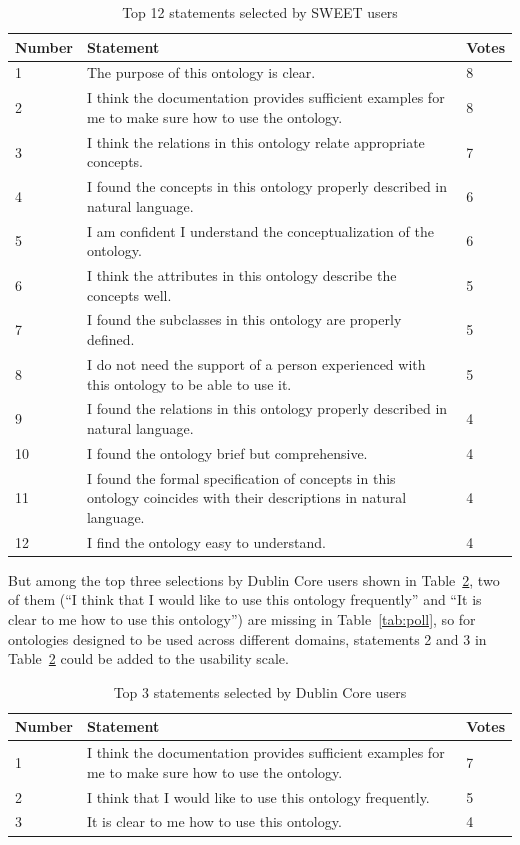 \begin{table}
	\centering
\caption{Top 12 statements selected by SWEET users}
\label{tab:sweet}
\begin{tabular}{|l|p{}|l|}
	\hline Number & Statement & Votes \\ 
	\hline 1 & The purpose of this ontology is clear. & 8 \\ 
	\hline 2 & I think the documentation provides sufficient examples for me to make sure how to use the ontology. & 8 \\ 
	\hline 3 & I think the relations in this ontology relate appropriate concepts. & 7 \\ 
	\hline 4 & I found the concepts in this ontology properly described in natural language. & 6 \\ 
	\hline 5 & I am confident I understand the conceptualization of the ontology. & 6 \\ 
	\hline 6 & I think the attributes in this ontology describe the concepts well. & 5 \\ 
	\hline 7 & I found the subclasses in this ontology are properly defined. & 5 \\ 
	\hline 8 & I do not need the support of a person experienced with this ontology to be able to use it. & 5 \\ 
	\hline 9 & I found the relations in this ontology properly described in natural language. & 4 \\ 
	\hline 10 & I found the ontology brief but comprehensive. & 4 \\ 
	\hline 11 & I found the formal specification of concepts in this ontology coincides with their descriptions in natural language. & 4 \\ 
	\hline 12 & I find the ontology easy to understand. & 4 \\ 
	\hline 
\end{tabular} 
\end{table}
But among the top three selections by Dublin Core users shown in Table~\ref{tab:dc}, two of them (``I think that I would like to use this ontology frequently'' and ``It is clear to me how to use this ontology'') are missing in Table~\ref{tab:poll}, so for ontologies designed to be used across different domains, statements 2 and 3 in Table~\ref{tab:dc} could be added to the usability scale.
\begin{table}
	\centering
	\caption{Top 3 statements selected by Dublin Core users}
	\label{tab:dc}
	\begin{tabular}{|l|p{}|l|}
		\hline Number & Statement & Votes \\ 
		\hline 1 & I think the documentation provides sufficient examples for me to make sure how to use the ontology. & 7 \\ 
		\hline 2 & I think that I would like to use this ontology frequently. & 5 \\ 
		\hline 3 & It is clear to me how to use this ontology. & 4 \\ 
		\hline 
	\end{tabular} 
\end{table}
